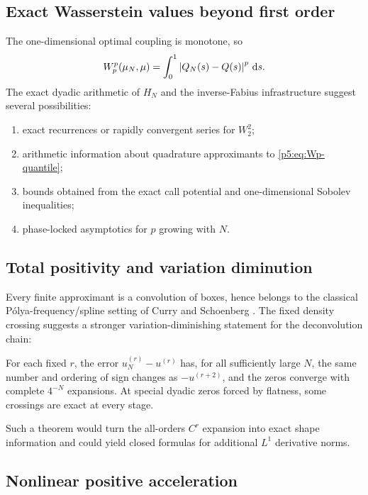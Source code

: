 \documentclass[11pt,oneside]{article}
\numberwithin{equation}{section}
\theoremstyle{definition}
\theoremstyle{remark}
\newcommand{\dd}{\,\mathrm d}
\begin{document}
\subsection{Exact Wasserstein values beyond first order}

The one-dimensional optimal coupling is monotone, so
\begin{equation}
 W_p^p(\mu_N,\mu)=\int_0^1\abs{Q_N(s)-Q(s)}^p\dd s.
 \label{p5:eq:Wp-quantile}
\end{equation}
The exact dyadic arithmetic of $H_N$ and the inverse-Fabius infrastructure suggest several possibilities:

\begin{enumerate}
\item exact recurrences or rapidly convergent series for $W_2^2$;
\item arithmetic information about quadrature approximants to \eqref{p5:eq:Wp-quantile};
\item bounds obtained from the exact call potential and one-dimensional Sobolev inequalities;
\item phase-locked asymptotics for $p$ growing with $N$.
\end{enumerate}

\subsection{Total positivity and variation diminution}

Every finite approximant is a convolution of boxes, hence belongs to the classical P\'olya-frequency/spline setting of Curry and Schoenberg \cite{p5:CurrySchoenberg1966}.  The fixed density crossing suggests a stronger variation-diminishing statement for the deconvolution chain:

\begin{conjecture}
For each fixed $r$, the error $u_N^{(r)}-u^{(r)}$ has, for all sufficiently large $N$, the same number and ordering of sign changes as $-u^{(r+2)}$, and the zeros converge with complete $4^{-N}$ expansions.  At special dyadic zeros forced by flatness, some crossings are exact at every stage.
\end{conjecture}

Such a theorem would turn the all-orders $C^r$ expansion into exact shape information and could yield closed formulas for additional $L^1$ derivative norms.

\subsection{Nonlinear positive acceleration}
\end{document}
